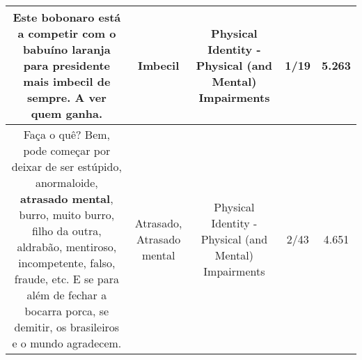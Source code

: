 \documentclass[11pt]{article}
\newlength\mylength
\begin{document}
\begin{center}
\begin{longtable}{|C{.65\mylength}|C{.30\mylength}|C{.12\mylength}|C{.12\mylength}|C{.12\mylength}|}
  \small Este bobonaro está a competir com o babuíno laranja para presidente mais \textbf{imbecil} de sempre. A ver quem ganha.\normalsize   & Imbecil & Physical Identity - Physical (and Mental) Impairments & 1/19 & 5.263 \\  \hline
  \small Faça o quê? Bem, pode começar por deixar de ser estúpido, anormaloide, \textbf{a\textbf{trasado} mental}, burro, muito burro, filho da outra, aldrabão, mentiroso, incompetente, falso, fraude, etc. E se para além de fechar a bocarra porca, se demitir, os brasileiros e o mundo agradecem.\normalsize   & Atrasado, Atrasado mental & Physical Identity - Physical (and Mental) Impairments & 2/43 & 4.651 \\  \hline
  
\end{longtable}
\end{center}
\end{document}
